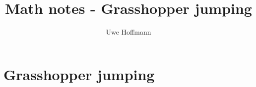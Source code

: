 

\title{Math notes - Grasshopper jumping}
\author{Uwe Hoffmann}



\setcounter{chapter}{1}
\chapter*{Grasshopper jumping}
